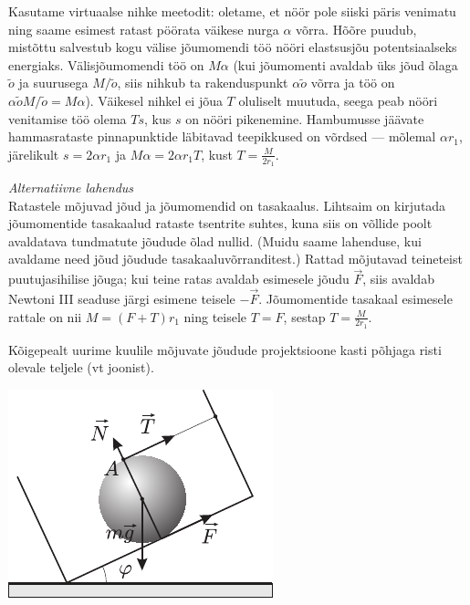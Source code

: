 \documentclass[10pt, twoside]{article}
\begin{document}
{%

\solu
Kasutame virtuaalse nihke meetodit: oletame, et nöör pole siiski päris venimatu ning
saame esimest ratast pöörata väikese nurga $\alpha$ võrra. Hõõre puudub,
mistõttu salvestub kogu välise jõumomendi töö nööri elastsusjõu potentsiaalseks
energiaks. Välisjõumomendi töö on $M \alpha$ (kui jõumomenti avaldab üks jõud
õlaga $\tilde o$ ja suurusega $M / \tilde o$, siis nihkub ta rakenduspunkt $\alpha
\tilde o$ võrra ja töö on $\alpha \tilde o M / \tilde o = M \alpha$). Väikesel
nihkel ei jõua $T$ oluliselt muutuda, seega peab nööri venitamise töö olema $T
s$, kus $s$ on nööri pikenemine. Hambumusse jäävate hammasrataste pinnapunktide
läbitavad teepikkused on võrdsed --- mõlemal $\alpha r_1$, järelikult $s = 2
\alpha r_1$ ja $M \alpha = 2 \alpha r_1 T$, kust $T = \frac{M}{2 r_1}$.

\vspace{0.5\baselineskip}
\textit{Alternatiivne lahendus}\\
Ratastele mõjuvad jõud ja jõumomendid on tasakaalus. Lihtsaim on kirjutada
jõumomentide tasakaalud rataste tsentrite suhtes, kuna siis on võllide poolt
avaldatava tundmatute jõudude õlad nullid. (Muidu saame lahenduse, kui avaldame
need jõud jõudude tasakaaluvõrranditest.) Rattad mõjutavad teineteist
puutujasihilise jõuga; kui teine ratas avaldab esimesele jõudu $\vec F$, siis
avaldab Newtoni III seaduse järgi esimene teisele $-\vec F$. Jõumomentide
tasakaal esimesele rattale on nii $M = (F+T) r_1$ ning teisele $T=F$, sestap
$T = \frac{M}{2 r_1}$.
\probend
\bigskip


\solu
Kõigepealt uurime kuulile mõjuvate jõudude projektsioone kasti põhjaga risti olevale teljele (vt joonist).

\begin{center}
	\includegraphics[width=0.5\linewidth]{2006-lahg-07-lah}
\end{center}

}
\end{document}
